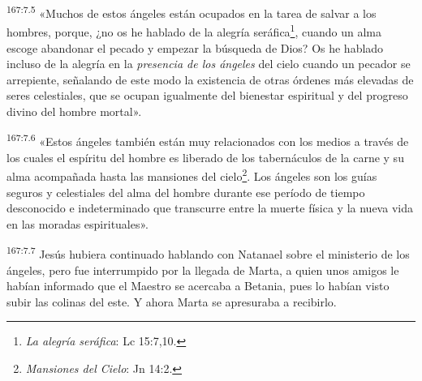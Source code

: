 \par 
\textsuperscript{167:7.5} «Muchos de estos ángeles están ocupados en la tarea de salvar a los hombres, porque, ¿no os he hablado de la alegría seráfica\footnote{\textit{La alegría seráfica}: Lc 15:7,10.}, cuando un alma escoge abandonar el pecado y empezar la búsqueda de Dios? Os he hablado incluso de la alegría en la \textit{presencia de los ángeles} del cielo cuando un pecador se arrepiente, señalando de este modo la existencia de otras órdenes más elevadas de seres celestiales, que se ocupan igualmente del bienestar espiritual y del progreso divino del hombre mortal».

\par 
\textsuperscript{167:7.6} «Estos ángeles también están muy relacionados con los medios a través de los cuales el espíritu del hombre es liberado de los tabernáculos de la carne y su alma acompañada hasta las mansiones del cielo\footnote{\textit{Mansiones del Cielo}: Jn 14:2.}. Los ángeles son los guías seguros y celestiales del alma del hombre durante ese período de tiempo desconocido e indeterminado que transcurre entre la muerte física y la nueva vida en las moradas espirituales».

\par 
\textsuperscript{167:7.7} Jesús hubiera continuado hablando con Natanael sobre el ministerio de los ángeles, pero fue interrumpido por la llegada de Marta, a quien unos amigos le habían informado que el Maestro se acercaba a Betania, pues lo habían visto subir las colinas del este. Y ahora Marta se apresuraba a recibirlo.